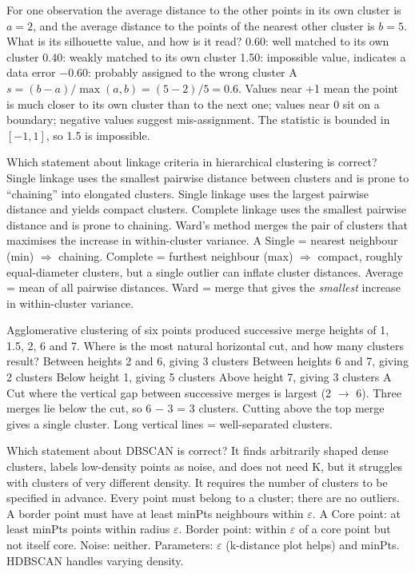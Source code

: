 {For one observation the average distance to the other points in its own cluster is $a=2$, and the average distance to the points of the nearest other cluster is $b=5$. What is its silhouette value, and how is it read?}
{0.60: well matched to its own cluster}
{0.40: weakly matched to its own cluster}
{1.50: impossible value, indicates a data error}
{$-0.60$: probably assigned to the wrong cluster}
{A}
{$s=(b-a)/\max(a,b)=(5-2)/5=0.6$. Values near +1 mean the point is much closer to its own cluster than to the next one; values near 0 sit on a boundary; negative values suggest mis-assignment. The statistic is bounded in $[-1,1]$, so 1.5 is impossible.}

{Which statement about linkage criteria in hierarchical clustering is correct?}
{Single linkage uses the smallest pairwise distance between clusters and is prone to ``chaining'' into elongated clusters.}
{Single linkage uses the largest pairwise distance and yields compact clusters.}
{Complete linkage uses the smallest pairwise distance and is prone to chaining.}
{Ward's method merges the pair of clusters that maximises the increase in within-cluster variance.}
{A}
{Single = nearest neighbour (min) $\Rightarrow$ chaining. Complete = furthest neighbour (max) $\Rightarrow$ compact, roughly equal-diameter clusters, but a single outlier can inflate cluster distances. Average = mean of all pairwise distances. Ward = merge that gives the \emph{smallest} increase in within-cluster variance.}

{Agglomerative clustering of six points produced successive merge heights of 1, 1.5, 2, 6 and 7. Where is the most natural horizontal cut, and how many clusters result?}
{Between heights 2 and 6, giving 3 clusters}
{Between heights 6 and 7, giving 2 clusters}
{Below height 1, giving 5 clusters}
{Above height 7, giving 3 clusters}
{A}
{Cut where the vertical gap between successive merges is largest (2 $\rightarrow$ 6). Three merges lie below the cut, so 6 $-$ 3 = 3 clusters. Cutting above the top merge gives a single cluster. Long vertical lines = well-separated clusters.}

{Which statement about DBSCAN is correct?}
{It finds arbitrarily shaped dense clusters, labels low-density points as noise, and does not need K, but it struggles with clusters of very different density.}
{It requires the number of clusters to be specified in advance.}
{Every point must belong to a cluster; there are no outliers.}
{A border point must have at least minPts neighbours within $\varepsilon$.}
{A}
{Core point: at least minPts points within radius $\varepsilon$. Border point: within $\varepsilon$ of a core point but not itself core. Noise: neither. Parameters: $\varepsilon$ (k-distance plot helps) and minPts. HDBSCAN handles varying density.}


